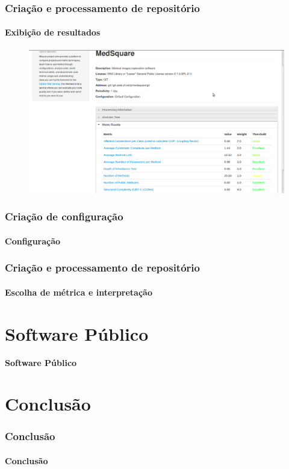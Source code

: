 \documentclass{beamer}
\begin{document}
  \begin{frame}
    \frametitle{Criação e processamento de repositório}
    \framesubtitle{Exibição de resultados}

    \begin{figure}[htb]
      \begin{center}
        \includegraphics[scale=0.24]{images/04-new-repository-results.png}
      \end{center}
    \end{figure}
  \end{frame}

  \begin{frame}
    \frametitle{Criação de configuração}
    \framesubtitle{Configuração}
  \end{frame}

  \begin{frame}
    \frametitle{Criação e processamento de repositório}
    \framesubtitle{Escolha de métrica e interpretação}
  \end{frame}

\section{Software Público}
\begin{frame}
  \LARGE{\textbf{Software Público}}
\end{frame}

\section{Conclusão}
\begin{frame}
  \frametitle{Conclusão}
  \framesubtitle{}

  \LARGE{\textbf{Conclusão}}
\end{frame}
\end{document}
